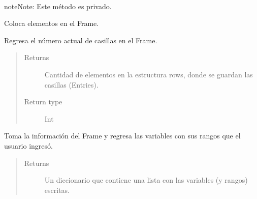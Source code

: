 \documentclass[letterpaper,10pt,english]{sphinxmanual}
\begin{document}
\begin{fulllineitems}
\begin{fulllineitems}
\end{fulllineitems}


\begin{fulllineitems}
\label{View/Main/DecisionVariable/VariableFrame:View.Main.DecisionVariable.VariableFrame.VariableFrame._VariableFrame__grid_widgets}~
\begin{notice}{note}{Note:}
Este método es privado.
\end{notice}

Coloca elementos en el Frame.

\end{fulllineitems}


\begin{fulllineitems}
\label{View/Main/DecisionVariable/VariableFrame:View.Main.DecisionVariable.VariableFrame.VariableFrame.get_current_elements}
Regresa el número actual de casillas en el Frame.
\begin{quote}\begin{description}
\item[{Returns}] \leavevmode
Cantidad de elementos en la estructura rows, donde se guardan las casillas (Entries).

\item[{Return type}] \leavevmode
Int

\end{description}\end{quote}

\end{fulllineitems}


\begin{fulllineitems}
\label{View/Main/DecisionVariable/VariableFrame:View.Main.DecisionVariable.VariableFrame.VariableFrame.get_information}
Toma la información del Frame y regresa las variables con sus rangos que 
el usuario ingresó.
\begin{quote}\begin{description}
\item[{Returns}] \leavevmode
Un diccionario que contiene una lista con las variables (y rangos) escritas.


\end{description}
\end{quote}
\end{fulllineitems}
\end{fulllineitems}
\end{document}
